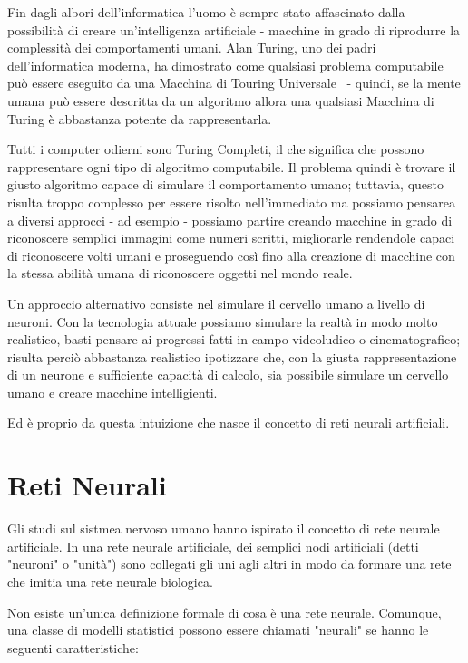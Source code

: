 \nocite{Lipton:2009}
Fin dagli albori dell'informatica l'uomo \`e sempre stato affascinato dalla possibilit\`a di creare un'intelligenza artificiale - macchine in grado di riprodurre la complessit\`a dei comportamenti umani.
Alan Turing, uno dei padri dell'informatica moderna, ha dimostrato come qualsiasi problema computabile pu\`o essere eseguito da una Macchina di Touring Universale~\cite{wiki:MacchinaTuring} - quindi, se la mente umana pu\`o essere descritta da un algoritmo allora una qualsiasi Macchina di Turing \`e abbastanza potente da rappresentarla.

Tutti i computer odierni sono Turing Completi, il che significa che possono rappresentare ogni tipo di algoritmo computabile.
Il problema quindi \`e trovare il giusto algoritmo capace di simulare il comportamento umano; tuttavia, questo risulta troppo complesso per essere risolto nell'immediato ma possiamo pensarea a diversi approcci - ad esempio - possiamo partire creando macchine in grado di riconoscere semplici immagini come numeri scritti, migliorarle rendendole capaci di riconoscere volti umani e proseguendo cos\`i fino alla creazione di macchine con la stessa abilit\`a umana di riconoscere oggetti nel mondo reale.

Un approccio alternativo consiste nel simulare il cervello umano a livello di neuroni.
Con la tecnologia attuale possiamo simulare la realt\`a in modo molto realistico, basti pensare ai progressi fatti in campo videoludico o cinematografico; risulta perci\`o abbastanza realistico ipotizzare che, con la giusta rappresentazione di un neurone e sufficiente capacit\`a di calcolo, sia possibile simulare un cervello umano e creare macchine intelligienti.

Ed \`e proprio da questa intuizione che nasce il concetto di reti neurali artificiali.

\section{Reti Neurali}
Gli studi sul sistmea nervoso umano hanno ispirato il concetto di rete neurale artificiale.
In una rete neurale artificiale, dei semplici nodi artificiali (detti "neuroni" o "unit\`a") sono collegati gli uni agli altri in modo da formare una rete che imitia una rete neurale biologica.

Non esiste un'unica definizione formale di cosa \`e una rete neurale.
Comunque, una classe di modelli statistici possono essere chiamati "neurali" se hanno le seguenti caratteristiche:

